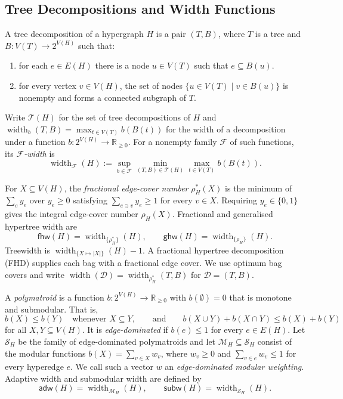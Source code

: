 \documentclass[11pt,letterpaper]{article}
\theoremstyle{definition}
\theoremstyle{remark}
\newcommand{\R}{\mathbb R}
\newcommand{\ghw}{\mathsf{ghw}}
\newcommand{\fhw}{\mathsf{fhw}}
\newcommand{\adw}{\mathsf{adw}}
\newcommand{\subw}{\mathsf{subw}}
\providecommand{\adw}{\operatorname{adw}}
\providecommand{\subw}{\operatorname{subw}}
\providecommand{\fhw}{\operatorname{fhw}}
\begin{document}
\subsection{Tree Decompositions and Width Functions}
%
A tree decomposition of a hypergraph $H$ is a pair $(T,B)$, where $T$ is a tree and $B : V(T)\to 2^{V(H)}$ such that:
\begin{enumerate}
\item for each $e \in E(H)$ there is a node $u \in V(T)$ such that $e \subseteq B(u)$.
\item for every vertex $v \in V(H)$, the set of nodes $\{u \in V(T) \mid v \in B(u)\}$ is nonempty and forms a connected subgraph of $T$.
\end{enumerate}
Write
$\mathcal T(H)$ for the set of tree decompositions of $H$ and
$\operatorname{width}_b(T,B)=\max_{t\in V(T)}b(B(t))$ for the width of a
decomposition under a function $b:2^{V(H)}\to\R_{\ge0}$. For a nonempty family
$\mathcal F$ of such functions, its \emph{$\mathcal F$-width} is
\begin{equation}
 \operatorname{width}_{\mathcal F}(H)
 :=\sup_{b\in\mathcal F}\min_{(T,B)\in\mathcal T(H)}
                         \max_{t\in V(T)}b(B(t)).
 \label{eq:F-width}
\end{equation}

For $X\subseteq V(H)$, the \emph{fractional edge-cover number} $\rho_H^*(X)$ is the minimum of
$\sum_e y_e$ over $y_e\ge0$ satisfying $\sum_{e\ni v}y_e\ge1$ for every
$v\in X$. Requiring $y_e\in\{0,1\}$ gives the integral edge-cover number
$\rho_H(X)$. Fractional and generalised hypertree width are
\[
 \fhw(H)=\operatorname{width}_{\{\rho_H^*\}}(H),
 \qquad
 \ghw(H)=\operatorname{width}_{\{\rho_H\}}(H).
\]
Treewidth is
$\operatorname{width}_{\{X\mapsto|X|\}}(H)-1$.
A fractional hypertree decomposition (FHD) supplies each bag with a
fractional edge cover. We use optimum bag covers and write
$\operatorname{width}(\mathcal D)=\operatorname{width}_{\rho_H^*}(T,B)$
for $\mathcal D=(T,B)$.

A \emph{polymatroid} is a function $b:2^{V(H)}\to\R_{\ge0}$ with
$b(\emptyset)=0$ that is monotone and submodular. That is,
\[
 b(X)\le b(Y) \quad\text{whenever }X\subseteq Y,
 \qquad\text{and}\qquad
 b(X\cup Y)+b(X\cap Y) \le b(X)+b(Y)
\]
for all $X,Y\subseteq V(H)$.
It is \emph{edge-dominated} if $b(e)\le1$ for every $e\in E(H)$.
Let $\mathcal S_H$ be the family of edge-dominated polymatroids and let
$\mathcal M_H\subseteq\mathcal S_H$ consist of the modular functions
$b(X)=\sum_{v\in X}w_v$, where $w_v\ge0$ and
$\sum_{v\in e}w_v\le1$ for every hyperedge $e$. We call such a vector $w$
an \emph{edge-dominated modular weighting}. Adaptive width and submodular
width are defined by~\cite{adw,Marx13}
\[
 \adw(H)=\operatorname{width}_{\mathcal M_H}(H),
 \qquad
 \subw(H)=\operatorname{width}_{\mathcal S_H}(H).
\]
\end{document}
